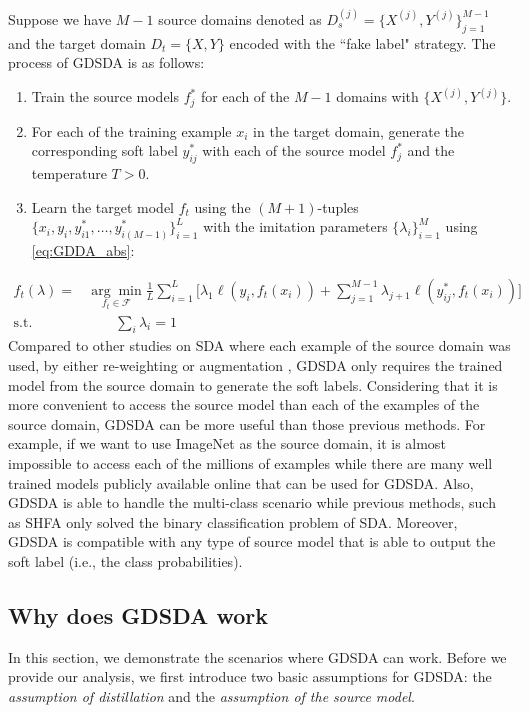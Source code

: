 Suppose we have $M-1$ source domains denoted as $D_s^{(j)}=\{X^{(j)},Y^{(j)}\}_{j=1}^{M-1}$ and the target domain $D_t=\{X,Y\}$ encoded with the ``fake label" strategy. The process of GDSDA is as follows:
\begin{enumerate}
	\item Train the source models $f^*_j$ for each of the $M-1$ domains with $\{X^{(j)},Y^{(j)}\}$.
	\item For each of the training example $x_i$ in the target domain, generate the corresponding soft label $y^*_{ij}$ with each of the source model $f^*_j$ and the temperature $T>0$.
	\item Learn the target model $f_t$ using the $(M+1)$-tuples $\{x_i,y_i,y^*_{i1},\dots,y^*_{i(M-1)}\}_{i=1}^L$ with the imitation parameters $\{\lambda_i\}^M_{i=1}$ using \eqref{eq:GDDA_abs}:
\end{enumerate} 
\begin{equation}\label{eq:GDDA_abs}
\begin{aligned}
f_t(\lambda)=&\underset{f_t \in \mathcal{F}}{\arg \min}\frac{1}{L}\sum_{i=1}^{L}\bigg[\lambda_1\ell\left(y_i,f_t(x_i)\right)+\sum_{j=1}^{M-1}\lambda_{j+1}\ell\left(y^*_{ij},f_t(x_i)\right)\bigg]\\
\text{s.t.} & \qquad \sum_i\lambda_i=1
\end{aligned}
\end{equation}
Compared to other studies on SDA where each example of the source domain was used, by either re-weighting \cite{Donahue_2013_CVPR,duan2012visual} or augmentation \cite{daume2010frustratingly}, GDSDA only requires the trained model from the source domain to generate the soft labels. Considering that it is more convenient to access the source model than each of the examples of the source domain, GDSDA can be more useful than those previous methods. For example, if we want to use ImageNet \cite{imagenet_cvpr09} as the source domain, it is almost impossible to access each of the millions of examples while there are many well trained models publicly available online that can be used for GDSDA. Also, GDSDA is able to handle the multi-class scenario while previous methods, such as SHFA\cite{duan2012learning} only solved the binary classification problem of SDA. Moreover, GDSDA is compatible with any type of source model that is able to output the soft label (i.e., the class probabilities).

\subsection{Why does GDSDA work}
In this section, we demonstrate the scenarios where GDSDA can work. Before we provide our analysis, we first introduce two basic assumptions for GDSDA: the \textit{assumption of distillation} and the \textit{assumption of the source model}.

